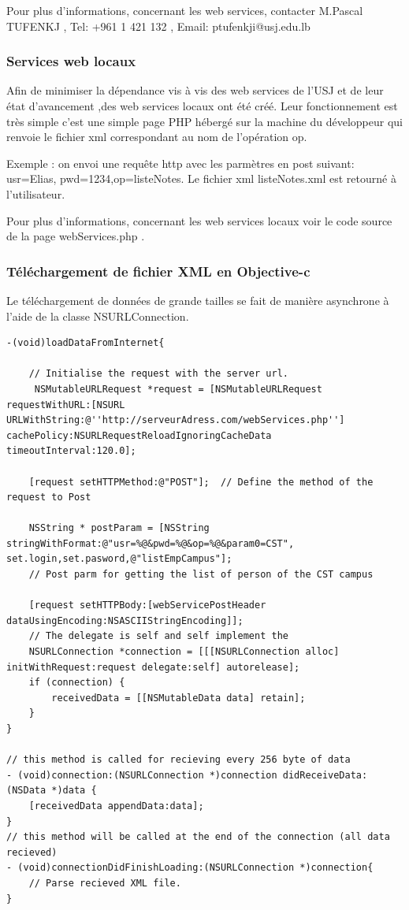 	Pour plus d'informations, concernant les web services, contacter M.Pascal TUFENKJ , Tel: +961 1 421 132 , Email: ptufenkji@usj.edu.lb
	
		\subsubsection{Services web locaux}
		Afin de minimiser la dépendance vis à vis des web services de l'USJ et de leur état d'avancement ,des web services locaux ont été créé. Leur fonctionnement est très simple c'est une simple page PHP hébergé sur la machine du développeur qui renvoie le fichier xml correspondant au nom de l'opération op. 
		
		Exemple : on envoi une requête http avec les parmètres en post suivant: usr=Elias, pwd=1234,op=listeNotes. Le fichier xml listeNotes.xml est retourné à l'utilisateur. 
		
		Pour plus d'informations, concernant les web services locaux voir le code source de la page webServices.php .

		\subsubsection{Téléchargement de fichier XML en Objective-c}
		Le téléchargement de données de grande tailles se fait de manière asynchrone à l'aide de la classe NSURLConnection. 
			\lstset{
			    style = Xcode,
			    caption=Téléchargement d'un fichier XML depuis internet de manière asynchrone et en transmettant les paramètres de la requête par POST .,
			    breaklines=true,
			    frame=single
			}
			
			\begin{lstlisting}[name= Loading data from internet in Objective-c, label=loadDataFromInternet]
-(void)loadDataFromInternet{

	// Initialise the request with the server url.
     NSMutableURLRequest *request = [NSMutableURLRequest requestWithURL:[NSURL URLWithString:@''http://serveurAdress.com/webServices.php'']   cachePolicy:NSURLRequestReloadIgnoringCacheData timeoutInterval:120.0]; 
   
    [request setHTTPMethod:@"POST"];  // Define the method of the request to Post
    
    NSString * postParam = [NSString stringWithFormat:@"usr=%@&pwd=%@&op=%@&param0=CST",  set.login,set.pasword,@"listEmpCampus"];
    // Post parm for getting the list of person of the CST campus
                 
    [request setHTTPBody:[webServicePostHeader dataUsingEncoding:NSASCIIStringEncoding]];
	// The delegate is self and self implement the 
    NSURLConnection *connection = [[[NSURLConnection alloc] initWithRequest:request delegate:self] autorelease]; 
    if (connection) { 
        receivedData = [[NSMutableData data] retain];
    } 
}

// this method is called for recieving every 256 byte of data
- (void)connection:(NSURLConnection *)connection didReceiveData:(NSData *)data {
    [receivedData appendData:data];
}
// this method will be called at the end of the connection (all data recieved)
- (void)connectionDidFinishLoading:(NSURLConnection *)connection{
	// Parse recieved XML file.
}
\end{lstlisting}
